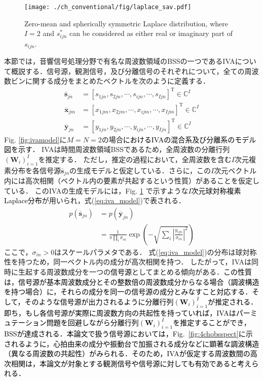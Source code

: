\begin{figure}[t]
\centering
\texttt{[image: ./ch\_conventional/fig/laplace\_sav.pdf]}
\caption{Zero-mean and spherically symmetric Laplace distribution, where $I=2$ and $s^*_{ijn}$ can be considered as either real or imaginary part of $s_{ijn}$.}
\label{fig:laplace}
\end{figure}
{本節では，音響信号処理分野で有名な周波数領域のBSSの一つであるIVAについて概説する．信号源，観測信号，及び分離信号のそれぞれについて，全ての周波数ビンに関する成分をまとめたベクトルを次のように定義する．}
\begin{align}
    \overline{\bm{s}}_{jn} &= [s_{1jn}, s_{2jn}, \cdots, s_{ijn}, \cdots, s_{Ijn} ]^{\mathrm{T}} \in \mathbb{C}^{I} \\
    \overline{\bm{x}}_{jm} &= [x_{1jm}, x_{2jm}, \cdots, x_{ijm}, \cdots, x_{Ijm} ]^{\mathrm{T}} \in \mathbb{C}^{I} \\
    \overline{\bm{y}}_{jn} &= [y_{1jn}, y_{2jn}, \cdots, y_{ijn}, \cdots, y_{Ijn} ]^{\mathrm{T}} \in \mathbb{C}^{I}
\end{align}
Fig. \ref{fig:ivamodel}に$M=N=2$の場合\textcolor{black}{におけるIVAの混合系及び分離系のモデル図を示す．}
IVAは時間周波数領域BSSであるため，全周波数の分離行列$( \bm{W}_i )_{i=1}^I$を推定する．
ただし，推定の過程{において，}全周波数を含む$I$次元{複素}分布を各信号源{$\overline{\bm{s}}_{jn}$の生成モデルと仮定している．さらに，この}$I$次元ベクトル内には高次相関（ベクトル内の要素が共起するという性質）があることを仮定している．
このIVAの生成モデルには，Fig. \ref{fig:laplace} で示すような\textcolor{black}{$I$次元球対称複素Laplace分布}が用いられ，式(\ref{eq:iva_model})で表される．
\begin{align}
  \nonumber p(\overline{\bm{s}}_{jn}) &= p(\overline{\bm{y}}_{jn}) \\
&= \frac{1}{\pi \prod_{i} \sigma_{in}} \exp \left(  - \sqrt{ \sum_i \left| \frac{y_{ijn}}{\sigma_{in}} \right|^2}  \right)
\label{eq:iva_model}    
\end{align}
ここで，$\sigma_{in}>0$はスケールパラメタである．
式(\ref{eq:iva_model})の分布は球対称性を持つため，同一ベクトル内の成分が高次相関を持つ\cite{Kim2007_iva}．
したがって，IVAは同時に生起する周波数成分を一つの\textcolor{black}{信号源}としてまとめる傾向がある．\textcolor{black}{この性質は，信号源が基本周波数成分とその整数倍の周波数成分からなる場合（調波構造を持つ場合）に，それらの成分を同一の信号源の成分とみなすこと対応する．そして，そのような信号源が出力されるように分離行列$( \bm{W}_i )_{i=1}^I$が推定される．即ち，もし各信号源が実際に周波数方向の共起性を持っていれば，IVAはパーミュテーション問題を回避しながら分離行列$( \bm{W}_i )_{i=1}^I$を推定することができ，BSSが達成される．本論文で扱う信号源においては，Fig.~\ref{fig:4chobsspect}に示されるように，心拍由来の成分や振動台で加振される成分などに顕著な調波構造（異なる周波数の共起性）がみられる．そのため，IVAが仮定する周波数間の高次相関は，本論文が対象とする観測信号や信号源に対しても有効であると考えられる．}

